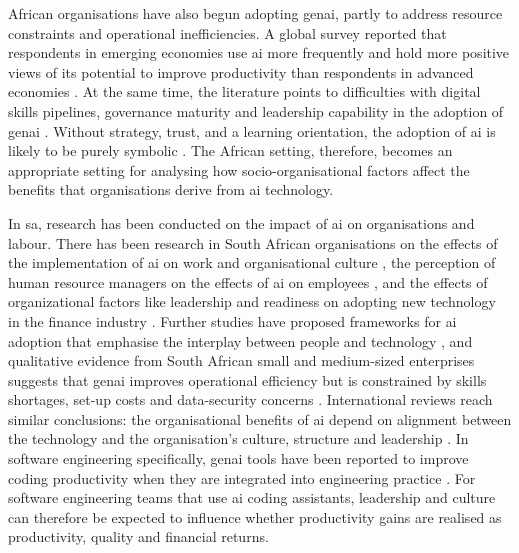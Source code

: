 African organisations have also begun adopting \gls{genai}, partly to address resource constraints and operational inefficiencies. A global survey reported that respondents in emerging economies use \gls{ai} more frequently and hold more positive views of its potential to improve productivity than respondents in advanced economies \parencite{Gillespie2025}. At the same time, the literature points to difficulties with digital skills pipelines, governance maturity and leadership capability in the adoption of \gls{genai} \parencite{Hughes2026, Isagah2024}. Without strategy, trust, and a learning orientation, the adoption of \gls{ai} is likely to be purely symbolic \parencite{Ransbotham2020}. The African setting, therefore, becomes an appropriate setting for analysing how socio-organisational factors affect the benefits that organisations derive from \gls{ai} technology.

In \gls{sa}, research has been conducted on the impact of \gls{ai} on organisations and labour. There has been research in South African organisations on the effects of the implementation of \gls{ai} on work and organisational culture  \parencite{Murire2024}, the perception of human resource managers on the effects of \gls{ai} on employees \parencite{Poisat2024}, and the effects of organizational factors like leadership and readiness on adopting new technology in the finance industry \parencite{Matsepe2022}. Further studies have proposed frameworks for \gls{ai} adoption that emphasise the interplay between people and technology \parencite{Smit2024}, and qualitative evidence from South African small and medium-sized enterprises suggests that \gls{genai} improves operational efficiency but is constrained by skills shortages, set-up costs and data-security concerns \parencite{Muzuva2024}. International reviews reach similar conclusions: the organisational benefits of \gls{ai} depend on alignment between the technology and the organisation’s culture, structure and leadership \parencite{Romeo2025, Kassa2025}. In software engineering specifically, \gls{genai} tools have been reported to improve coding productivity when they are integrated into engineering practice \parencite{Alenezi2025, Sergeyuk2025}. For software engineering teams that use \gls{ai} coding assistants, leadership and culture can therefore be expected to influence whether productivity gains are realised as productivity, quality and financial returns.

